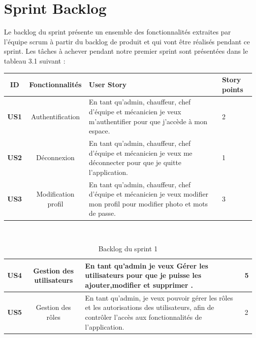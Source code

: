 \section{Sprint Backlog}
Le backlog du sprint présente un ensemble des fonctionnalités extraites par l’équipe scrum à partir du backlog de produit et qui vont être réalisés pendant ce sprint. Les tâches à achever
pendant notre premier sprint sont présentées dans le tableau 3.1 suivant :
\bigskip
\begin{table}[htbp]
  \centering
  \renewcommand{\arraystretch}{1.5} %
  \begin{tabular}{|c|c|p{7.8cm}|p{1.1cm}|}
    \hline
    \textbf{ID}  & \textbf{Fonctionnalités} & \centering \textbf{User Story}                                                                                             & \textbf {Story points} \\
    \hline
    \textbf{US1} & Authentification         & En tant qu'admin, chauffeur, chef d'équipe et mécanicien je veux m'authentifier pour que j'accède à mon espace.            & 2                      \\
    \hline
    \textbf{US2} & Déconnexion              & En tant qu'admin, chauffeur, chef d'équipe et mécanicien je veux me déconnecter pour que je quitte l'application.          & 1                      \\
    \hline
    \textbf{US3} & Modification profil      & En tant qu'admin, chauffeur, chef d'équipe et mécanicien je veux modifier mon profil pour modifier photo et mots de passe. & 3                      \\
    \hline
  \end{tabular}
  \

\end{table}
\begin{table}[htbp]
  \centering
  \renewcommand{\arraystretch}{1.5} %
  \begin{tabular}{|c|c|p{7.5cm}|p{1.1cm}|}
    \hline
    \textbf{US4} & Gestion des utilisateurs & En tant qu'admin je veux Gérer les utilisateurs pour que je puisse les ajouter,modifier et supprimer .                                                   & 5 \\
    \hline
    \textbf{US5} & Gestion des rôles        & En tant qu'admin, je veux pouvoir gérer les rôles et les autorisations des utilisateurs, afin de contrôler l'accès aux fonctionnalités de l'application. & 2 \\
    \hline
  \end{tabular}
  \caption{Backlog du sprint 1}

\end{table}
\newpage
